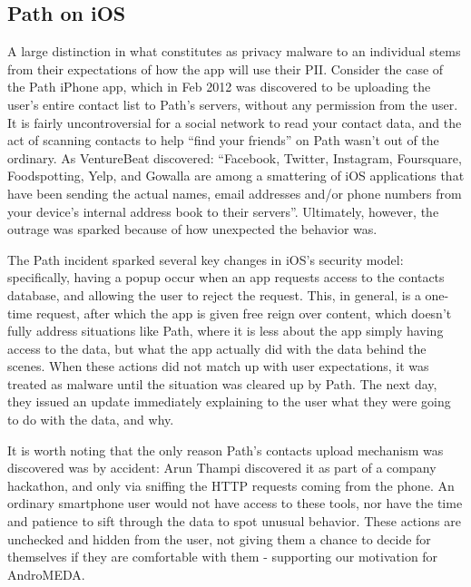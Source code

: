 \subsection{Path on iOS}
\label{sec:path}
A large distinction in what constitutes as privacy malware to an individual stems from their expectations of how the app will use their PII. Consider the case of the Path iPhone app, which in Feb 2012 was discovered to be uploading the user's entire contact list to Path's servers, without any permission from the user\citep{thampi2012}. It is fairly uncontroversial for a social network to read your contact data, and the act of scanning contacts to help ``find your friends'' on Path wasn't out of the ordinary. As VentureBeat discovered: ``Facebook, Twitter, Instagram, Foursquare, Foodspotting, Yelp, and Gowalla are among a smattering of iOS applications that have been sending the actual names, email addresses and/or phone numbers from your device's internal address book to their servers''\citep{vb2012addressbook}. Ultimately, however, the outrage was sparked because of how unexpected the behavior was.

The Path incident sparked several key changes in iOS's security model: specifically, having a popup occur when an app requests access to the contacts database, and allowing the user to reject the request. This, in general, is a one-time request, after which the app is given free reign over content\citep{AppleContacts}, which doesn't fully address situations like Path, where it is less about the app simply having access to the data, but what the app actually did with the data behind the scenes. When these actions did not match up with user expectations, it was treated as malware until the situation was cleared up by Path. The next day, they issued an update immediately explaining to the user what they were going to do with the data, and why.

It is worth noting that the only reason Path's contacts upload mechanism was discovered was by accident: Arun Thampi discovered it as part of a company hackathon, and only via sniffing the HTTP requests coming from the phone. An ordinary smartphone user would not have access to these tools, nor have the time and patience to sift through the data to spot unusual behavior. These actions are unchecked and hidden from the user, not giving them a chance to decide for themselves if they are comfortable with them - supporting our motivation for AndroMEDA.

